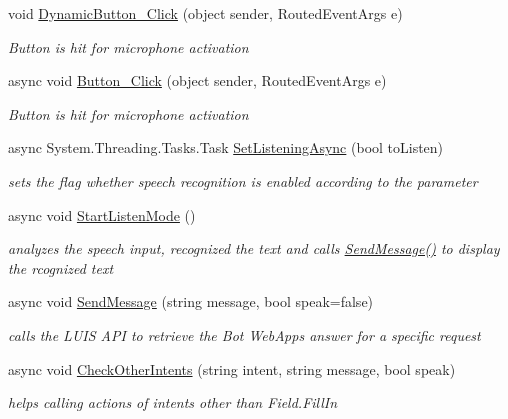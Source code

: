 \begin{DoxyCompactItemize}
void \mbox{\hyperlink{class_listen_to_me_1_1_main_page_a1b565fbb49fd56541853357581d0cd44}{Dynamic\+Button\+\_\+\+Click}} (object sender, Routed\+Event\+Args e)
\begin{DoxyCompactList}\small\item\em Button is hit for microphone activation \end{DoxyCompactList}\item 
async void \mbox{\hyperlink{class_listen_to_me_1_1_main_page_a5277043a631146593b3f10699577408f}{Button\+\_\+\+Click}} (object sender, Routed\+Event\+Args e)
\begin{DoxyCompactList}\small\item\em Button is hit for microphone activation \end{DoxyCompactList}\item 
async System.\+Threading.\+Tasks.\+Task \mbox{\hyperlink{class_listen_to_me_1_1_main_page_a57d75ef6bb9c10b0c944c3eb5513b076}{Set\+Listening\+Async}} (bool to\+Listen)
\begin{DoxyCompactList}\small\item\em sets the flag whether speech recognition is enabled according to the parameter \end{DoxyCompactList}\item 
async void \mbox{\hyperlink{class_listen_to_me_1_1_main_page_ab9fba04f0fc94773c2838f6af87ec14b}{Start\+Listen\+Mode}} ()
\begin{DoxyCompactList}\small\item\em analyzes the speech input, recognized the text and calls \mbox{\hyperlink{class_listen_to_me_1_1_main_page_a09c2518852d4261ff6a2118c8e01de9f}{Send\+Message()}} to display the rcognized text \end{DoxyCompactList}\item 
async void \mbox{\hyperlink{class_listen_to_me_1_1_main_page_a09c2518852d4261ff6a2118c8e01de9f}{Send\+Message}} (string message, bool speak=false)
\begin{DoxyCompactList}\small\item\em calls the L\+U\+IS A\+PI to retrieve the Bot Web\+App\textquotesingle{}s answer for a specific request \end{DoxyCompactList}\item 
async void \mbox{\hyperlink{class_listen_to_me_1_1_main_page_a83b106bf0b81203d9c02f1bf4dcdd02e}{Check\+Other\+Intents}} (string intent, string message, bool speak)
\begin{DoxyCompactList}\small\item\em helps calling actions of intents other than Field.\+Fill\+In \end{DoxyCompactList}\item 

\end{DoxyCompactItemize}
